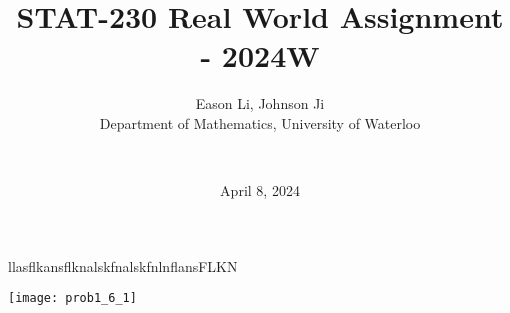 \documentclass[final]{beamer}
\title{STAT-230 Real World Assignment - 2024W}
\author{
    Eason Li, Johnson Ji \\
    Department of Mathematics, University of Waterloo \and \\
}
\date{April 8, 2024} %
\begin{document}
\maketitle


\begin{minipage}{.5\textwidth}
    llasflkansflknalskfnalskfnlnflansFLKN
\end{minipage}%
\begin{minipage}{0.5\textwidth}
    \centering
    \texttt{[image: prob1\_6\_1]}
    \caption{$dt =$}
    \label{fig:prob1_6_1}
\end{minipage}
\end{document}
